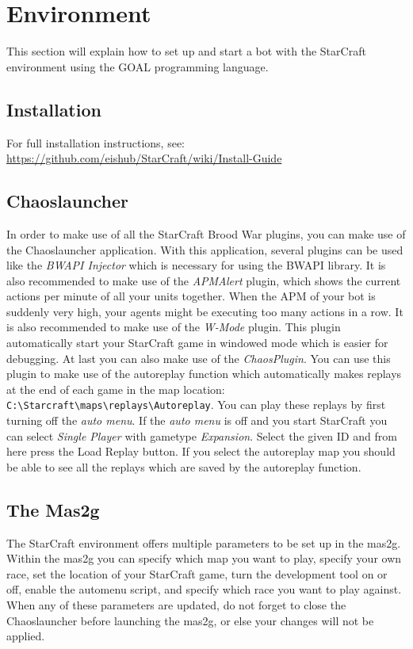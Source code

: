 \chapter{Environment}
This section will explain how to set up and start a bot with the StarCraft environment using the GOAL programming language.

\section{Installation}
For full installation instructions, see: \url{https://github.com/eishub/StarCraft/wiki/Install-Guide}

\section{Chaoslauncher}
In order to make use of all the StarCraft Brood War plugins, you can make use of the Chaoslauncher application. With this application, several plugins can be used like the \textit{BWAPI Injector} which is necessary for using the BWAPI library. It is also recommended to make use of the \textit{APMAlert} plugin, which shows the current actions per minute of all your units together. When the APM of your bot is suddenly very high, your agents might be executing too many actions in a row. It is also recommended to make use of the \textit{W-Mode} plugin. This plugin automatically start your StarCraft game in windowed mode which is easier for debugging. At last you can also make use of the \textit{ChaosPlugin}. You can use this plugin to make use of the autoreplay function which automatically makes replays at the end of each game in the map location: \verb|C:\Starcraft\maps\replays\Autoreplay|. You can play these replays by first turning off the \textit{auto menu}. If the \textit{auto menu} is off and you start StarCraft you can select \textit{Single Player} with gametype \textit{Expansion}. Select the given ID and from here press the Load Replay button. If you select the autoreplay map you should be able to see all the replays which are saved by the autoreplay function.

\section{The Mas2g}
\label{mas2g}
The StarCraft environment offers multiple parameters to be set up in the mas2g. Within the mas2g you can specify which map you want to play, specify your own race, set the location of your StarCraft game, turn the development tool on or off, enable the automenu script, and specify which race you want to play against. When any of these parameters are updated, do not forget to close the Chaoslauncher before launching the mas2g, or else your changes will not be applied.

